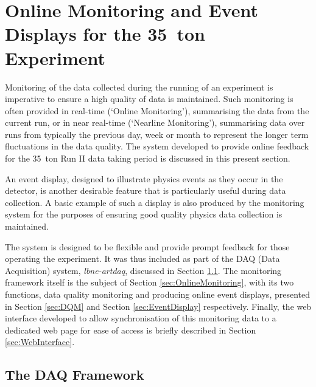
\graphicspath{{OnlineMonitoring/Figs/}}

\chapter{Online Monitoring and Event Displays for the 35~ton Experiment}\label{chap:OnlineMonitoring}

Monitoring of the data collected during the running of an experiment is imperative to ensure a high quality of data is maintained.  Such monitoring is often provided in real-time (`Online Monitoring'), summarising the data from the current run, or in near real-time (`Nearline Monitoring'), summarising data over runs from typically the previous day, week or month to represent the longer term fluctuations in the data quality.  The system developed to provide online feedback for the 35~ton Run II data taking period is discussed in this present section.

An event display, designed to illustrate physics events as they occur in the detector, is another desirable feature that is particularly useful during data collection.  A basic example of such a display is also produced by the monitoring system for the purposes of ensuring good quality physics data collection is maintained.

The system is designed to be flexible and provide prompt feedback for those operating the experiment.  It was thus included as part of the DAQ (Data Acquisition) system, \textit{lbne-artdaq}, discussed in Section \ref{sec:lbne-artdaq}.  The monitoring framework itself is the subject of Section \ref{sec:OnlineMonitoring}, with its two functions, data quality monitoring and producing online event displays, presented in Section \ref{sec:DQM} and Section \ref{sec:EventDisplay} respectively.  Finally, the web interface developed to allow synchronisation of this monitoring data to a dedicated web page for ease of access is briefly described in Section \ref{sec:WebInterface}.

\section{The DAQ Framework}\label{sec:lbne-artdaq}


